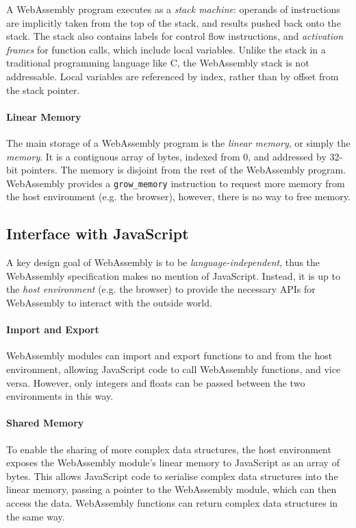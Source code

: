 A WebAssembly program executes as a \emph{stack machine}: operands of instructions are implicitly taken from the top of the stack, and results pushed back onto the stack. The stack also contains labels for control flow instructions, and \emph{activation frames} for function calls, which include local variables. Unlike the stack in a traditional programming language like C, the WebAssembly stack is not addressable. Local variables are referenced by index, rather than by offset from the stack pointer.

\paragraph{Linear Memory}

The main storage of a WebAssembly program is the \emph{linear memory}, or simply the \emph{memory}. It is a contiguous array of bytes, indexed from 0, and addressed by 32-bit pointers. The memory is disjoint from the rest of the WebAssembly program. WebAssembly provides a \texttt{grow\_memory} instruction to request more memory from the host environment (e.g. the browser), however, there is no way to free memory.

\subsection{Interface with JavaScript}

A key design goal of WebAssembly is to be \emph{language-independent}, thus the WebAssembly specification makes no mention of JavaScript. Instead, it is up to the \emph{host environment} (e.g. the browser) to provide the necessary APIs for WebAssembly to interact with the outside world.

\paragraph{Import and Export} WebAssembly modules can import and export functions to and from the host environment, allowing JavaScript code to call WebAssembly functions, and vice versa. However, only integers and floats can be passed between the two environments in this way.

\paragraph{Shared Memory} To enable the sharing of more complex data structures, the host environment exposes the WebAssembly module's linear memory to JavaScript as an array of bytes. This allows JavaScript code to serialise complex data structures into the linear memory, passing a pointer to the WebAssembly module, which can then access the data. WebAssembly functions can return complex data structures in the same way.

